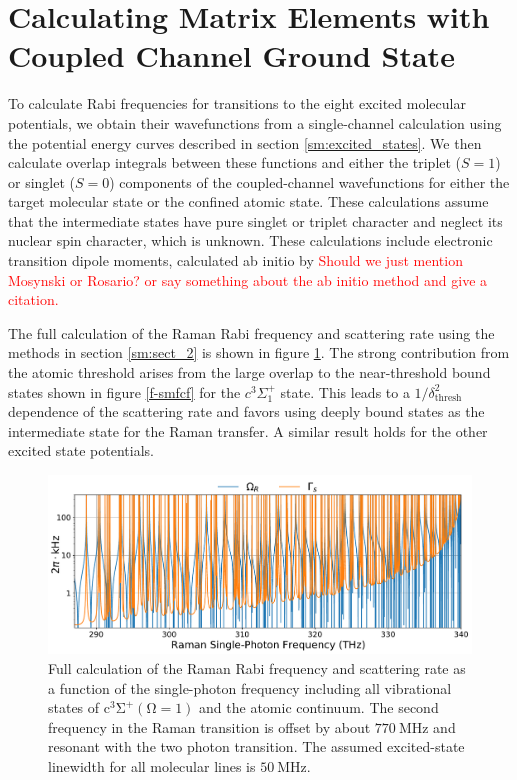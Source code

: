 \documentclass[aps,secnumarabic,amsmath,amssymb,10pt,superscriptaddress]{revtex4}
\begin{document}
\section{Calculating Matrix Elements with Coupled Channel Ground State}
To calculate Rabi frequencies for transitions to the eight excited molecular potentials, we
obtain their wavefunctions from a single-channel calculation \cite{Fattal1996} using the potential energy curves described in section \ref{sm:excited_states}. We
then calculate overlap integrals between these functions and either the triplet ($S=1$) or singlet ($S=0$) components of the
coupled-channel wavefunctions for either the target molecular state or the confined atomic state.
These calculations assume that the intermediate states have pure singlet or triplet character and neglect its
nuclear spin character, which is unknown. These calculations include electronic transition dipole moments, calculated ab initio by \textcolor{red}{Should we just mention Mosynski or Rosario? or say something about the ab initio method and give a citation.}

The full calculation of the Raman Rabi frequency and scattering rate using the methods in section \ref{sm:sect_2} is shown in figure \ref{f-sm}. The strong contribution from the atomic threshold arises from the large overlap to the near-threshold bound states shown in figure \ref{f-smfcf} for the $c^3\Sigma^+_1$ state. This leads to a $1/\delta_{\text{thresh}}^2$ dependence of the scattering rate and favors using deeply bound states as the intermediate state for the Raman transfer. A similar result holds for the other excited state potentials.



\begin{figure}[ht!]
  \includegraphics[width=\textwidth]{imgs/raman_theory_full.pdf}
  \caption{ Full calculation of the Raman Rabi frequency and scattering rate as a function of the single-photon frequency including all vibrational states of $ \mathrm{c^3\Sigma^+(\Omega = 1)}$ and the atomic continuum. The second frequency in the Raman transition is offset by about $770~\mathrm{MHz}$ and resonant with the two photon transition. The assumed excited-state linewidth for all molecular lines is $50~\text{MHz} $.
    \label{f-sm}}
\end{figure}
\end{document}
